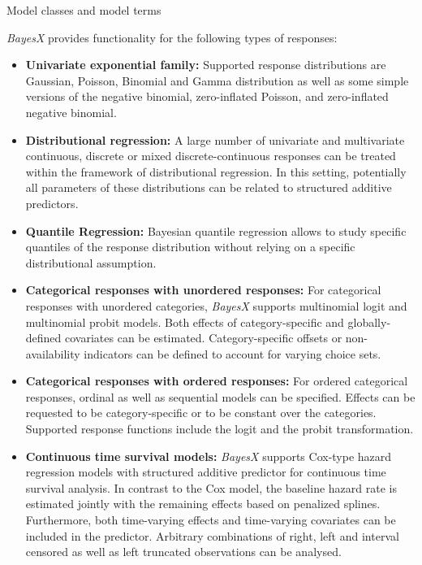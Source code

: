 \begin{stanza}{Model classes and model terms}

{\em BayesX} provides functionality for the following types of
responses:

\begin{itemize}
\item{\bf\sffamily Univariate exponential family:} Supported response distributions are Gaussian, Poisson, Binomial and Gamma distribution as well as some simple versions of the
    negative binomial, zero-inflated Poisson, and zero-inflated negative binomial.

\item {\bf\sffamily Distributional regression:} A large number of univariate and multivariate continuous, discrete or mixed discrete-continuous responses can be treated within the framework of distributional regression. In this setting, potentially all parameters of these distributions can be related to structured additive predictors.

\item {\bf\sffamily Quantile Regression:} Bayesian quantile regression allows to study specific quantiles of the response distribution without relying on a specific distributional assumption.

\item{\bf\sffamily Categorical responses with unordered responses:} For categorical responses with unordered categories,
    {\em BayesX} supports multinomial logit and multinomial probit models. Both effects of category-specific and
    globally-defined covariates can be estimated. Category-specific offsets or non-availability indicators can be defined
    to account for varying choice sets.

\item{\bf\sffamily Categorical responses with ordered responses:} For ordered categorical responses, ordinal as well as
    sequential models can be specified. Effects can be requested to be category-specific or to be constant over the
    categories. Supported response functions include the logit and the probit transformation.

\item{\bf\sffamily Continuous time survival models:} {\em BayesX} supports Cox-type hazard regression models with
    structured additive predictor for continuous time survival analysis. In contrast to the Cox model, the baseline hazard
    rate is estimated jointly with the remaining effects based on penalized splines. Furthermore, both time-varying effects
    and time-varying covariates can be included in the predictor. Arbitrary combinations of right, left and interval
    censored as well as left truncated observations can be analysed.


\end{itemize}
\end{stanza}
